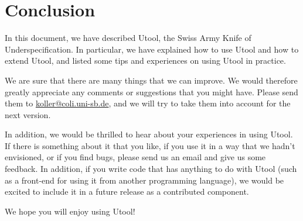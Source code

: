 
\section{Conclusion}  \label{sec:conclusion}

In this document, we have described Utool, the Swiss Army Knife of
Underspecification. In particular, we have explained how to use Utool
and how to extend Utool, and listed some tips and experiences on using
Utool in practice.

We are sure that there
are many things that we can improve. We would therefore greatly
appreciate any comments or suggestions that you might have. Please
send them to \url{koller@coli.uni-sb.de}, and we will try to take them
into account for the next version. 

In addition, we would be thrilled to hear about your experiences in using Utool. If there is something about it that you like, if you use it in a way that we hadn't envisioned, or if you find bugs, please send us an email and give us some feedback. In addition, if you write code that has anything to do with Utool (such as a front-end for using it from another programming language), we would be excited to include it in a future release as a contributed component.

We hope you will enjoy using Utool!





